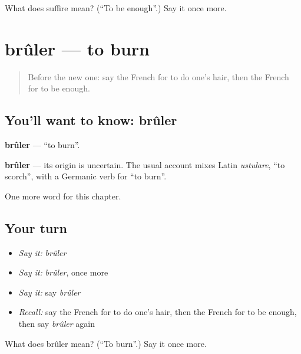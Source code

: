 \begin{tcolorbox}[breakable,colback=teal!4,colframe=teal!35!black,title={Before you move on}]
What does suffire mean? (\textquotedblleft{}To be enough\textquotedblright{}.) Say it once more.
\end{tcolorbox}
\section[brûler]{brûler — to burn}

\label{lesson:FR-C236-bruler}



\begin{quote}
Before the new one: say the French for to do one's hair, then the French for to be enough.
\end{quote}

\subsection*{You'll want to know: brûler}
\textbf{brûler} — \textquotedblleft{}to burn\textquotedblright{}.

\begin{cousinweb}
\textbf{brûler} — its origin is uncertain. The usual account mixes Latin \emph{ustulare}, \textquotedblleft{}to scorch\textquotedblright{}, with a Germanic verb for \textquotedblleft{}to burn\textquotedblright{}.
\end{cousinweb}

\begin{grammarlens}[title={What you've built}]
One more word for this chapter.
\end{grammarlens}

\subsection*{Your turn}
\begin{itemize}
\raggedright
  \item \emph{Say it:} \emph{brûler}
  \item \emph{Say it:} \emph{brûler}, once more
  \item \emph{Say it:} say \emph{brûler}
  \item \emph{Recall:} say the French for to do one's hair, then the French for to be enough, then say \emph{brûler} again
\end{itemize}

\begin{tcolorbox}[breakable,colback=teal!4,colframe=teal!35!black,title={Before you move on}]
What does brûler mean? (\textquotedblleft{}To burn\textquotedblright{}.) Say it once more.
\end{tcolorbox}
